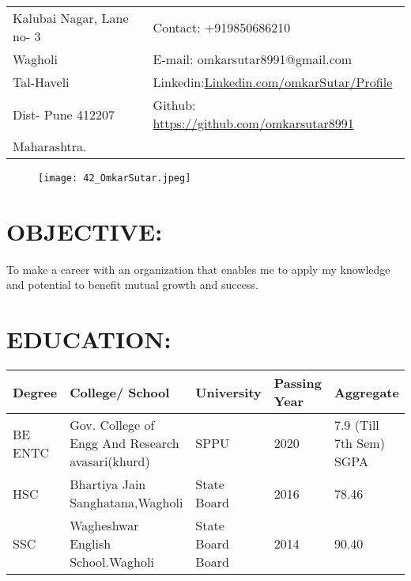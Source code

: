 \documentclass[margin,line]{res}
\begin{document}
\hspace{5cm}

\begin{resume}

\begin{tabular}{@{}p{8.5cm} p{10cm}}
Kalubai Nagar, Lane no- 3             & {Contact:} +919850686210 \\
Wagholi
 & {E-mail:}       
  omkarsutar8991@gmail.com\\
Tal-Haveli         & {Linkedin:}\href{https://www.linkedin.com/in/omkar-sutar-97b351175/}{Linkedin.com/omkarSutar/Profile}\\
Dist- Pune 412207 & 
{Github:}     \url{ https://github.com/omkarsutar8991}\\
Maharashtra.
\end{tabular}

\begin{figure}[h]
	\hspace{11.5cm}
	\texttt{[image: 42\_OmkarSutar.jpeg]}
\end{figure}

\section{\bf OBJECTIVE:}

To make a career with an organization that enables me to apply my knowledge and potential to benefit mutual growth and success.

\section{\bf EDUCATION:}
\vspace{0.5cm}



\begin{tabular}{|p{1.5cm}|p{4.5cm}|p{3cm}|p{1.7cm}|p{2cm}|} 
	\hline
	\textbf{Degree} & \textbf{College/ School} & \textbf{University} & \textbf{Passing Year} & \textbf{Aggregate}\\ [0.5ex] 
	\hline
	
	BE ENTC &Gov. College of Engg And Research avasari(khurd)   &SPPU &2020& 7.9 (Till 7th Sem) SGPA \\ 
	\hline
	HSC & Bhartiya Jain Sanghatana,Wagholi  & State Board  &2016 & 78.46 \\
	\hline
	SSC&Wagheshwar English School.Wagholi&State Board Board&2014&90.40\\
        \hline
\end{tabular}


\end{resume}
\end{document}
